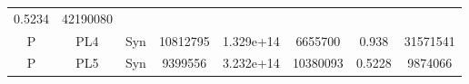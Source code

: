 \documentclass[]{article}
\begin{document}
\begin{longtable}[]{@{}cccccccc@{}}
\begin{minipage}[t]{0.08\columnwidth}
0.5234
\strut\end{minipage} &
\begin{minipage}[t]{0.12\columnwidth}\centering\strut
42190080
\strut\end{minipage}\tabularnewline
\begin{minipage}[t]{0.07\columnwidth}\centering\strut
P
\strut\end{minipage} &
\begin{minipage}[t]{0.07\columnwidth}\centering\strut
PL4
\strut\end{minipage} &
\begin{minipage}[t]{0.11\columnwidth}\centering\strut
Syn
\strut\end{minipage} &
\begin{minipage}[t]{0.11\columnwidth}\centering\strut
10812795
\strut\end{minipage} &
\begin{minipage}[t]{0.11\columnwidth}\centering\strut
1.329e+14
\strut\end{minipage} &
\begin{minipage}[t]{0.11\columnwidth}\centering\strut
6655700
\strut\end{minipage} &
\begin{minipage}[t]{0.08\columnwidth}\centering\strut
0.938
\strut\end{minipage} &
\begin{minipage}[t]{0.12\columnwidth}\centering\strut
31571541
\strut\end{minipage}\tabularnewline
\begin{minipage}[t]{0.07\columnwidth}\centering\strut
P
\strut\end{minipage} &
\begin{minipage}[t]{0.07\columnwidth}\centering\strut
PL5
\strut\end{minipage} &
\begin{minipage}[t]{0.11\columnwidth}\centering\strut
Syn
\strut\end{minipage} &
\begin{minipage}[t]{0.11\columnwidth}\centering\strut
9399556
\strut\end{minipage} &
\begin{minipage}[t]{0.11\columnwidth}\centering\strut
3.232e+14
\strut\end{minipage} &
\begin{minipage}[t]{0.11\columnwidth}\centering\strut
10380093
\strut\end{minipage} &
\begin{minipage}[t]{0.08\columnwidth}\centering\strut
0.5228
\strut\end{minipage} &
\begin{minipage}[t]{0.12\columnwidth}\centering\strut
9874066
\strut\end{minipage}\tabularnewline
\bottomrule
\end{longtable}
\end{document}
